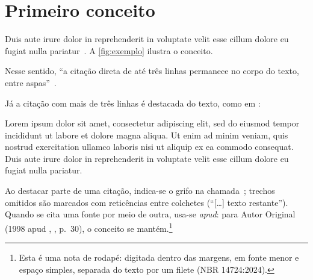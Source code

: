 \section{Primeiro conceito}
\label{sec:conceito-um}

Duis aute irure dolor in reprehenderit in voluptate velit esse cillum dolore eu
fugiat nulla pariatur~\parencite{exemplo-artigo}. A \autoref{fig:exemplo} ilustra
o conceito.

Nesse sentido, \enquote{a citação direta de até três linhas permanece no corpo do
texto, entre aspas}~\parencite[p. 15]{exemplo-livro}.

Já a citação com mais de três linhas é destacada do texto, como em
\textcite[p. 86]{exemplo-livro}:

\begin{citacao}
  Lorem ipsum dolor sit amet, consectetur adipiscing elit, sed do eiusmod tempor
  incididunt ut labore et dolore magna aliqua. Ut enim ad minim veniam, quis
  nostrud exercitation ullamco laboris nisi ut aliquip ex ea commodo consequat.
  Duis aute irure dolor in reprehenderit in voluptate velit esse cillum dolore eu
  fugiat nulla pariatur.
\end{citacao}

Ao destacar parte de uma citação, indica-se o grifo na
chamada~\parencite[p.~22, grifo nosso]{exemplo-artigo}; trechos omitidos são
marcados com reticências entre colchetes (\enquote{[\ldots] texto restante}).
Quando se cita uma fonte por meio de outra, usa-se \emph{apud}: para Autor
Original (1998 apud \citeauthor{exemplo-dissertacao}, \citeyear{exemplo-dissertacao},
p.~30), o conceito se mantém.\footnote{Esta é uma nota de rodapé: digitada dentro
das margens, em fonte menor e espaço simples, separada do texto por um filete
(NBR 14724:2024).}


